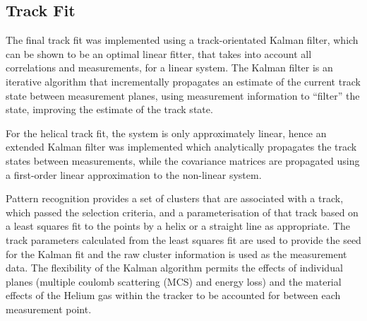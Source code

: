    \subsection{Track Fit}
   \label{subsec:FinalTrackFit}
   The final track fit was implemented using a track-orientated Kalman filter\cite{Fruhwirth,Billoir}, which can be shown to be an optimal linear fitter, that takes into account all correlations and measurements, for a linear system. The Kalman filter is an iterative algorithm that incrementally propagates an estimate of the current track state between measurement planes, using measurement information to ``filter'' the state, improving the estimate of the track state.
   
   For the helical track fit, the system is only approximately linear, hence an extended Kalman filter was implemented which analytically propagates the track states between measurements, while the covariance matrices are propagated using a first-order linear approximation to the non-linear system.

   Pattern recognition provides a set of clusters that are associated with a track, which passed the selection criteria, and a parameterisation of that track based on a least squares fit to the points by a helix or a straight line as appropriate. The track parameters calculated from the least squares fit are used to provide the seed for the Kalman fit and the raw cluster information is used as the measurement data. The flexibility of the Kalman algorithm permits the effects of individual planes (multiple coulomb scattering (MCS) and energy loss) and the material effects of the Helium gas within the tracker to be accounted for between each measurement point.

